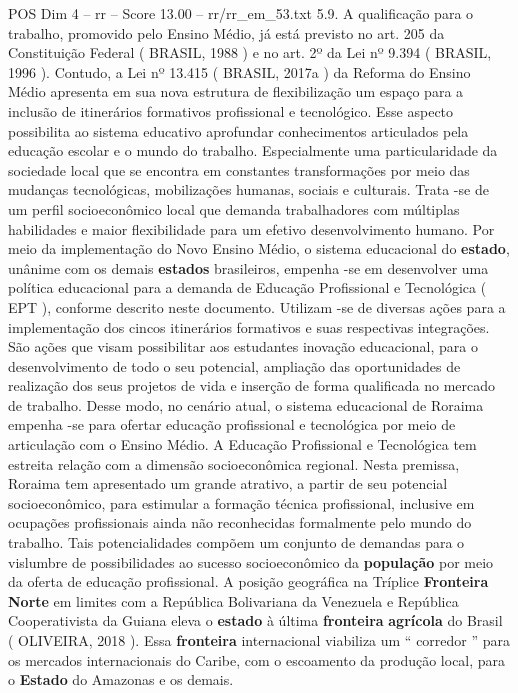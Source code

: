 \begin{textsample}{POS Dim 4 – rr – Score 13.00 – rr/rr\_em\_53.txt}  \label{ex:f4_pos_115}
5.9.
A qualificação para o trabalho, promovido pelo Ensino Médio, já está previsto no art. 205 da Constituição Federal ( BRASIL, 1988 ) e no art. 2º da Lei nº 9.394 ( BRASIL, 1996 ).
Contudo, a Lei nº 13.415 ( BRASIL, 2017a ) da Reforma do Ensino Médio apresenta em sua nova estrutura de flexibilização um espaço para a inclusão de itinerários formativos profissional e tecnológico.
Esse aspecto possibilita ao sistema educativo aprofundar conhecimentos articulados pela educação escolar e o mundo do trabalho.
Especialmente uma particularidade da sociedade local que se encontra em constantes transformações por meio das mudanças tecnológicas, mobilizações humanas, sociais e culturais.
Trata -se de um perfil socioeconômico local que demanda trabalhadores com múltiplas habilidades e maior flexibilidade para um efetivo desenvolvimento humano.
Por meio da implementação do Novo Ensino Médio, o sistema educacional do \textbf{estado}, unânime com os demais \textbf{estados} brasileiros, empenha -se em desenvolver uma política educacional para a demanda de Educação Profissional e Tecnológica ( EPT ), conforme descrito neste documento.
Utilizam -se de diversas ações para a implementação dos cincos itinerários formativos e suas respectivas integrações.
São ações que visam possibilitar aos estudantes inovação educacional, para o desenvolvimento de todo o seu potencial, ampliação das oportunidades de realização dos seus projetos de vida e inserção de forma qualificada no mercado de trabalho.
Desse modo, no cenário atual, o sistema educacional de Roraima empenha -se para ofertar educação profissional e tecnológica por meio de articulação com o Ensino Médio.
A Educação Profissional e Tecnológica tem estreita relação com a dimensão socioeconômica regional.
Nesta premissa, Roraima tem apresentado um grande atrativo, a partir de seu potencial socioeconômico, para estimular a formação técnica profissional, inclusive em ocupações profissionais ainda não reconhecidas formalmente pelo mundo do trabalho.
Tais potencialidades compõem um conjunto de demandas para o vislumbre de possibilidades ao sucesso socioeconômico da \textbf{população} por meio da oferta de educação profissional.
A posição geográfica na Tríplice \textbf{Fronteira} \textbf{Norte} em limites com a República Bolivariana da Venezuela e República Cooperativista da Guiana eleva o \textbf{estado} à última \textbf{fronteira} \textbf{agrícola} do Brasil ( OLIVEIRA, 2018 ).
Essa \textbf{fronteira} internacional viabiliza um “ corredor ” para os mercados internacionais do Caribe, com o escoamento da produção local, para o \textbf{Estado} do Amazonas e os demais.

\end{textsample}

